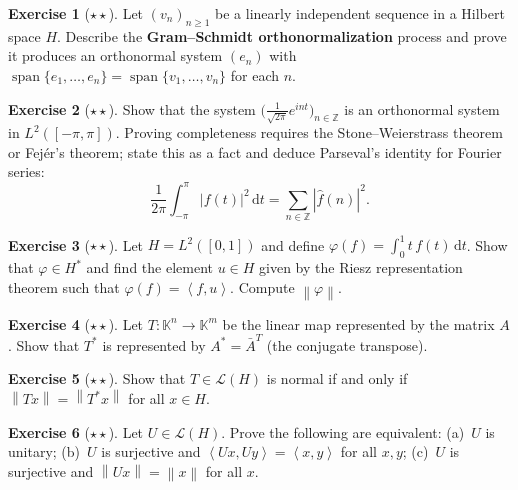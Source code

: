 \documentclass[a4paper,12pt]{book}
\DeclareMathOperator{\spn}{span}
\newcommand{\Z}{\mathbb{Z}}
\newcommand{\K}{\mathbb{K}}
\newcommand{\dd}{\mathrm{d}}
\newcommand{\norm}[1]{\left\| #1 \right\|}
\newcommand{\abs}[1]{\left| #1 \right|}
\newcommand{\inner}[2]{\left\langle #1, #2 \right\rangle}
\theoremstyle{definition}
\newtheorem{exercise}{Exercise}[chapter]
\theoremstyle{plain}
\theoremstyle{remark}
\begin{document}
\begin{exercise}[$\star\star$]
\label{exo:gram-schmidt}
Let $(v_n)_{n\ge 1}$ be a linearly independent sequence in a Hilbert
space $H$.  Describe the \textbf{Gram--Schmidt orthonormalization} process
and prove it produces an orthonormal system $(e_n)$ with
$\spn\{e_1,\dots,e_n\}=\spn\{v_1,\dots,v_n\}$ for each $n$.
\end{exercise}

\begin{exercise}[$\star\star$]
\label{exo:L2-basis-trig}
Show that the system $\bigl(\frac{1}{\sqrt{2\pi}}e^{int}\bigr)_{n\in\Z}$
is an orthonormal system in $L^2([-\pi,\pi])$.  Proving completeness
requires the Stone--Weierstrass theorem or Fej\'er's theorem; state this
as a fact and deduce Parseval's identity for Fourier series:
\[
  \frac{1}{2\pi}\int_{-\pi}^{\pi}\abs{f(t)}^2\,\dd t
  = \sum_{n\in\Z}\abs{\hat{f}(n)}^2.
\]
\end{exercise}

\begin{exercise}[$\star\star$]
\label{exo:riesz-application}
Let $H=L^2([0,1])$ and define $\varphi(f)=\int_0^1 t\,f(t)\,\dd t$.
Show that $\varphi\in H^*$ and find the element $u\in H$ given by the
Riesz representation theorem such that $\varphi(f)=\inner{f}{u}$.
Compute $\norm{\varphi}$.
\end{exercise}

\begin{exercise}[$\star\star$]
\label{exo:adjoint-matrix}
Let $T:\K^n\to\K^m$ be the linear map represented by the matrix $A$.
Show that $T^*$ is represented by $A^*=\bar{A}^T$ (the conjugate
transpose).
\end{exercise}

\begin{exercise}[$\star\star$]
\label{exo:normal-characterization}
Show that $T\in\mathcal{L}(H)$ is normal if and only if
$\norm{Tx}=\norm{T^*x}$ for all $x\in H$.
\end{exercise}

\begin{exercise}[$\star\star$]
\label{exo:unitary-preserves-inner}
Let $U\in\mathcal{L}(H)$.  Prove the following are equivalent:
(a)~$U$ is unitary;
(b)~$U$ is surjective and $\inner{Ux}{Uy}=\inner{x}{y}$ for all $x,y$;
(c)~$U$ is surjective and $\norm{Ux}=\norm{x}$ for all $x$.
\end{exercise}
\end{document}
